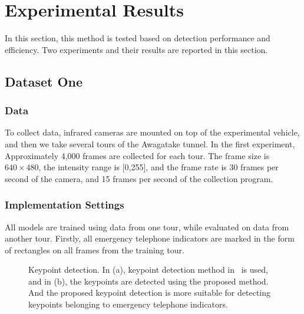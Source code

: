 \section{Experimental Results}
\label{exp}
In this section, this method is tested based on detection performance and efficiency. Two experiments  and their results are reported in this section.

\subsection{Dataset One}

\subsubsection{Data} To collect data, infrared cameras are mounted on top of the experimental vehicle, and then we take several tours of the Awagatake tunnel. In the first experiment,  Approximately 4,000 frames are collected for each tour. The frame size is $640\times 480$, the intensity range is [0,255], and the frame rate is 30 frames per second of the camera, and 15 frames per second of the collection program.

\subsubsection{Implementation Settings} All models are trained using data from one tour, while evaluated on data from another tour. Firstly, all emergency telephone indicators are marked in the form of rectangles on all frames from the training tour.

\begin{figure}
\centering
{}
\caption[Keypoint detection comparison]{Keypoint detection. In (a), keypoint detection method in~\citep{o12} is used, and in (b), the keypoints are detected using the proposed method. And the proposed keypoint detection is more suitable for detecting keypoints belonging to emergency telephone indicators.}
\label{ex1:va}
\end{figure}


